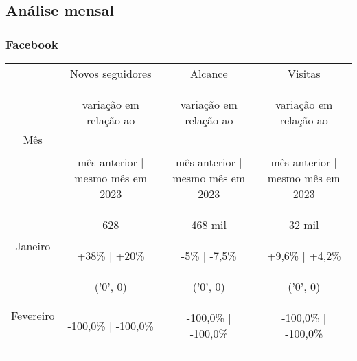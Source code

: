 \documentclass{article}%
\begin{document}
%
\subsection*{Análise mensal}%
\label{subsec:Anlisemensal}%
\subsubsection*{Facebook}%
\label{ssubsec:Facebook}%
\begin{minipage}{\textwidth}%
\centering%
\begin{tabular}{@{}|c|c|c|c|@{}}%
\toprule%
\multirow{3}{*}{Mês}&Novos seguidores&Alcance&Visitas\\%
&\begin{footnotesize}%
variação em relação ao%
\end{footnotesize}&\begin{footnotesize}%
variação em relação ao%
\end{footnotesize}&\begin{footnotesize}%
variação em relação ao%
\end{footnotesize}\\%
&\begin{footnotesize}%
mês anterior | mesmo mês em 2023%
\end{footnotesize}&\begin{footnotesize}%
mês anterior | mesmo mês em 2023%
\end{footnotesize}&\begin{footnotesize}%
mês anterior | mesmo mês em 2023%
\end{footnotesize}\\%
\midrule%
\multirow{2}{*}{Janeiro}&628&468 mil&32 mil\\%
&\begin{footnotesize}%
+38\% | +20\%%
\end{footnotesize}&\begin{footnotesize}%
{-}5\% | {-}7,5\%%
\end{footnotesize}&\begin{footnotesize}%
+9,6\% | +4,2\%%
\end{footnotesize}\\%
\midrule%
\multirow{2}{*}{Fevereiro}&('0', 0) &('0', 0) &('0', 0) \\%
&\begin{footnotesize}%
{-}100,0\% | {-}100,0\%%
\end{footnotesize}&\begin{footnotesize}%
{-}100,0\% | {-}100,0\%%
\end{footnotesize}&\begin{footnotesize}%
{-}100,0\% | {-}100,0\%%
\end{footnotesize}\\\bottomrule%
%
\end{tabular}%
\end{minipage}%
\end{document}
